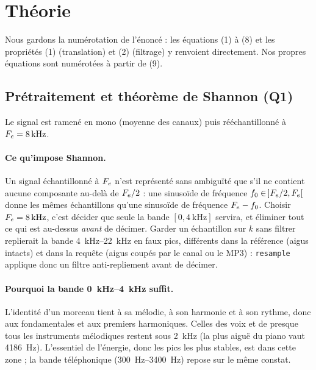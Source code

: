 \section{Théorie}
\label{sec-theorie}

Nous gardons la numérotation de l'énoncé : les équations (1) à (8) et les propriétés (1)
(translation) et (2) (filtrage) y renvoient directement. Nos propres équations sont
numérotées à partir de (9).

\subsection{Prétraitement et théorème de Shannon (Q1)}
\label{sec-shannon}

Le signal est ramené en mono (moyenne des canaux) puis rééchantillonné à
$F_e = \qty{8}{\kilo\hertz}$.

\paragraph{Ce qu'impose Shannon.} Un signal échantillonné à $F_e$ n'est représenté sans
ambiguïté que s'il ne contient aucune composante au-delà de $F_e/2$ : une sinusoïde de
fréquence $f_0 \in\, ]F_e/2, F_e[$ donne les mêmes échantillons qu'une sinusoïde de
fréquence $F_e - f_0$. Choisir $F_e = \qty{8}{\kilo\hertz}$, c'est décider que seule la bande
$[0, \qty{4}{\kilo\hertz}]$ servira, et éliminer tout ce qui est au-dessus \emph{avant} de
décimer. Garder un échantillon sur $k$ sans filtrer replierait la bande
\qtyrange{4}{22}{\kilo\hertz} en faux pics, différents dans la référence (aigus intacts) et
dans la requête (aigus coupés par le canal ou le MP3) : \texttt{resample} applique donc un
filtre anti-repliement avant de décimer.

\paragraph{Pourquoi la bande \qtyrange{0}{4}{\kilo\hertz} suffit.} L'identité d'un morceau
tient à sa mélodie, à son harmonie et à son rythme, donc aux fondamentales et aux premiers
harmoniques. Celles des voix et de presque tous les instruments mélodiques restent sous
\qty{2}{\kilo\hertz} (la plus aiguë du piano vaut \qty{4186}{\hertz}). L'essentiel de
l'énergie, donc les pics les plus stables, est dans cette zone ; la bande téléphonique
(\qtyrange{300}{3400}{\hertz}) repose sur le même constat.

